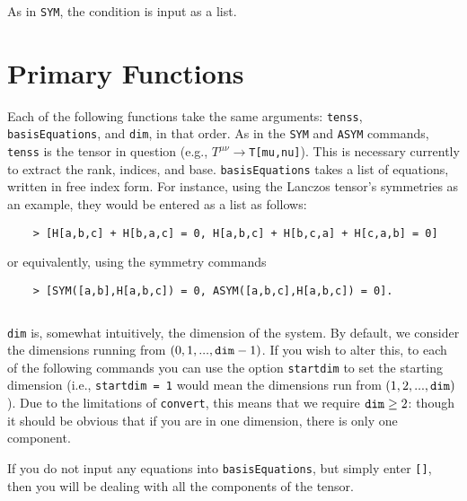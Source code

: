 \documentclass{article}
\begin{document}
As in \verb~SYM~, the condition is input as a list.

\section*{Primary Functions}

Each of the following functions take the same arguments: \verb~tenss~, \verb~basisEquations~, and \verb~dim~, in that order. As in the \verb~SYM~ and \verb~ASYM~ commands, \verb~tenss~ is the tensor in question (e.g., $T^{\mu \nu} \to$\verb~T[mu,nu]~). This is necessary currently to extract the rank, indices, and base. \verb~basisEquations~ takes a list of equations, written in free index form. For instance, using the Lanczos tensor's symmetries \cite{Agacy1999} as an example, they would be entered as a list as follows:

\begin{verbatim}
    > [H[a,b,c] + H[b,a,c] = 0, H[a,b,c] + H[b,c,a] + H[c,a,b] = 0]
\end{verbatim}
\begin{equation*}
    [H_{{a,b,c}}+H_{{b,a,c}}=0,H_{{a,b,c}}+H_{{b,c,a}}+H_{{c,a,b}}=0]
\end{equation*}
or equivalently, using the symmetry commands
\begin{verbatim}
    > [SYM([a,b],H[a,b,c]) = 0, ASYM([a,b,c],H[a,b,c]) = 0].
\end{verbatim}
\begin{equation*}
    [{\frac {H_{{a,b,c}}}{2}}+{\frac {H_{{b,a,c}}}{2}}=0,{\frac {H_{{a,b,c
}}}{6}}-{\frac {H_{{a,c,b}}}{6}}-{\frac {H_{{b,a,c}}}{6}}+{\frac {H_{{
b,c,a}}}{6}}+{\frac {H_{{c,a,b}}}{6}}-{\frac {H_{{c,b,a}}}{6}}=0]
\end{equation*}

\verb~dim~ is, somewhat intuitively, the dimension of the system. By default, we consider the dimensions running from $(0,1,...,\verb~dim~ -1)$. If you wish to alter this, to each of the following commands you can use the option \verb~startdim~ to set the starting dimension (i.e., \verb~startdim = 1~ would mean the dimensions run from $(1,2,...,\verb~dim~)$). Due to the limitations of \verb~convert~, this means that we require $\verb~dim~ \geq 2$: though it should be obvious that if you are in one dimension, there is only one component.

If you do not input any equations into \verb~basisEquations~, but simply enter \verb~[]~, then you will be dealing with all the components of the tensor.
\end{document}
